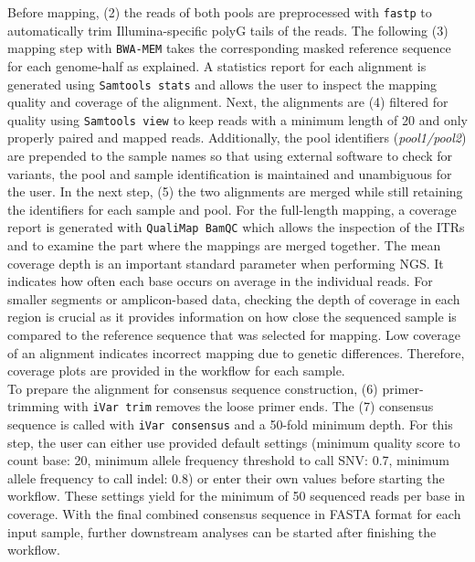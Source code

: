 Before mapping, (2) the reads of both pools are preprocessed with \texttt{fastp} to automatically trim Illumina-specific polyG tails of the reads. The following (3) mapping step with \texttt{BWA-MEM} takes the corresponding masked reference sequence for each genome-half as explained. A statistics report for each alignment is generated using \texttt{Samtools stats} and allows the user to inspect the mapping quality and coverage of the alignment. Next, the alignments are (4) filtered for quality using \texttt{Samtools view} to keep reads with a minimum length of 20 and only properly paired and mapped reads. Additionally, the pool identifiers (\textit{pool1/pool2}) are prepended to the sample names so that using external software to check for variants, the pool and sample identification is maintained and unambiguous for the user. In the next step, (5) the two alignments are merged while still retaining the identifiers for each sample and pool. For the full-length mapping, a coverage report is generated with \texttt{QualiMap BamQC} which allows the inspection of the \acp{ITR} and to examine the part where the mappings are merged together. The mean coverage depth is an important standard parameter when performing \ac{NGS}. It indicates how often each base occurs on average in the individual reads. For smaller segments or amplicon-based data, checking the depth of coverage in each region is crucial as it provides information on how close the sequenced sample is compared to the reference sequence that was selected for mapping. Low coverage of an alignment indicates incorrect mapping due to genetic differences. Therefore, coverage plots are provided in the workflow for each sample. \\
To prepare the alignment for consensus sequence construction, (6) primer-trimming with \texttt{iVar trim} removes the loose primer ends. The (7) consensus sequence is called with \texttt{iVar consensus} and a 50-fold minimum depth. For this step, the user can either use provided default settings (minimum quality score to count base: 20, minimum allele frequency threshold to call \ac{SNV}: 0.7, minimum allele frequency to call indel: 0.8) or enter their own values before starting the workflow. These settings yield for the minimum of 50 sequenced reads per base in coverage. With the final combined consensus sequence in FASTA format for each input sample, further downstream analyses can be started after finishing the workflow.

